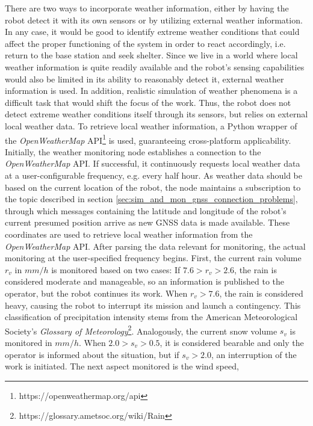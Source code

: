 \documentclass[english, master, utf8]{base/thesis_KBS}
\newcommand{\code}{\collectverb{\codebox}}
\begin{document}
There are two ways to incorporate weather information, either by having the robot detect it with its own sensors or by utilizing external weather information. In any case,
it would be good to identify extreme weather conditions that could affect the proper functioning of the system in order to react accordingly, i.e. return to the base station and
seek shelter. Since we live in a world where local weather information is quite readily available and the robot's sensing capabilities would also be limited in its ability to
reasonably detect it, external weather information is used. In addition, realistic simulation of weather phenomena is a difficult task that would shift the focus of the work.
Thus, the robot does not detect extreme weather conditions itself through its sensors, but relies on external local weather data. To retrieve local weather information, a Python
wrapper of the \textit{OpenWeatherMap} API\footnote{https://openweathermap.org/api} is used, guaranteeing cross-platform applicability. Initially, the weather monitoring node
establishes a connection to the \textit{OpenWeatherMap} API. If successful, it continuously requests local weather data at a user-configurable frequency, e.g. every half hour.
As weather data should be based on the current location of the robot, the node maintains a subscription to the \code{/fix} topic described in section
\ref{sec:sim_and_mon_gnss_connection_problems}, through which \code{NavSatFix} messages containing the latitude and longitude of the robot's current presumed position arrive as
new GNSS data is made available. These coordinates are used to retrieve local weather information from the \textit{OpenWeatherMap} API. After parsing the data relevant for
monitoring, the actual monitoring at the user-specified frequency begins. First, the current rain volume $r_v$ in $mm/h$ is monitored based on two cases: If $7.6 > r_v > 2.6$,
the rain is considered moderate and manageable, so an information is published to the operator, but the robot continues its work. When $r_v > 7.6$, the rain is considered heavy,
causing the robot to interrupt its mission and launch a contingency. This classification of precipitation intensity stems from the American Meteorological Society's
\textit{Glossary of Meteorology}\footnote{https://glossary.ametsoc.org/wiki/Rain}. Analogously, the current snow volume $s_v$ is monitored in $mm/h$. When $2.0 > s_v > 0.5$, it is
considered bearable and only the operator is informed about the situation, but if $s_v > 2.0$, an interruption of the work is initiated. The next aspect monitored is the wind speed,
\end{document}
